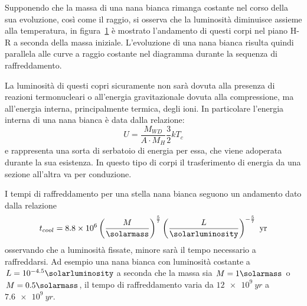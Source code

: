 Supponendo che la massa di una nana bianca rimanga costante nel corso della sua evoluzione, così come il raggio, si osserva che la luminosità diminuisce assieme alla temperatura, in figura~\ref{fig:WD} è mostrato l'andamento di questi corpi nel piano H-R a seconda della massa iniziale. L'evoluzione di una nana bianca risulta quindi parallela alle curve a raggio costante nel diagramma durante la sequenza di raffreddamento.
\begin{figure}
    \centering
     \qquad
    \caption{}\label{fig:WD}
\end{figure}

La luminosità di questi copri sicuramente non sarà dovuta alla presenza di reazioni termonucleari o all'energia gravitazionale dovuta alla compressione, ma all'energia interna, principalmente termica, degli ioni. In particolare l'energia interna di una nana bianca è data dalla relazione:
\[
    U = \frac{M_{WD}}{A \cdot M_{H}} \frac{3}{2} k T_c
\]
e rappresenta una sorta di serbatoio di energia per essa, che viene adoperata durante la sua esistenza. In questo tipo di corpi il trasferimento di energia da una sezione all'altra va per conduzione.

I tempi di raffreddamento per una stella nana bianca seguono un andamento dato dalla relazione
\begin{equation}
    t_{cool} = 8.8\times 10^6 \left(\frac{M}{\si{\solarmass}} \right)^{\frac{5}{7}} \left( \frac{L}{\si{\solarluminosity}} \right)^{-\frac{5}{7}} \mbox{ yr}
\end{equation}
osservando che a luminosità fissate, minore sarà il tempo necessario a raffreddarsi. Ad esempio una nana bianca con luminosità costante a $L = 10^{-4.5} \si{\solarluminosity}$ a seconda che la massa sia $M = 1\si{\solarmass}$ o $M = 0.5 \si{\solarmass}$, il tempo di raffreddamento varia da $\SI{12e9}{yr}$ a $\SI{7.6e9}{yr}$.

\subsection{}